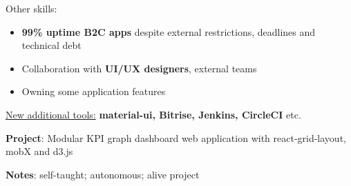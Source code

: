 \documentclass[10pt,a4paper,ragged2e,withhyper]{altacv}
\begin{document}
\medskip
Other skills:
\begin{itemize}
  \item \textbf{99\% uptime B2C apps} despite external restrictions, deadlines and technical debt
  \item Collaboration with \textbf{UI/UX designers}, external teams
  \item Owning some application features
\end{itemize}
\begin{itshape}
  \underline{New additional tools:}
  \small{\textbf{material-ui, Bitrise, Jenkins, CircleCI} etc.}
\end{itshape}

\divider

\textbf{Project}: Modular KPI graph dashboard web application with react-grid-layout, mobX and d3.js\

\textbf{Notes}: self-taught; autonomous; alive project
\end{document}
